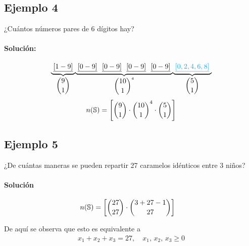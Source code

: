 \subsection*{Ejemplo 4}
¿Cuántos números pares de 6 dígitos hay?

\paragraph{Solución:}
\begin{equation*}
\underset{\dbinom{9}{1}}{\underbrace{~\underline{[1-9]}~}} \underset{\dbinom{10}{1}^4}{\underbrace{~\underline{[0-9]}~ ~\underline{[0-9]}~ ~\underline{[0-9]}~ ~\underline{[0-9]}~}} \underset{\dbinom{5}{1}}{\underbrace{\color{cyan} ~\underline{[0,2,4,6,8]}~}}
\end{equation*}
\begin{equation*}
n(\mathbb{S})=\left[\binom{9}{1}\cdot\binom{10}{1}^4\cdot\binom{5}{1}\right]
\end{equation*}

\subsection*{Ejemplo 5}
¿De cuántas maneras se pueden repartir 27 caramelos idénticos entre 3 niños?
\paragraph{Solución}

\begin{align*}
n(\mathbb{S})&=\left[\binom{27}{27}\cdot\binom{3+27-1}{27}\right]
\end{align*}

De aquí se observa que esto es equivalente a
\begin{align*}
x_1+x_2+x_3=27,\quad x_1,\,x_2,\,x_3\geq0
\end{align*}